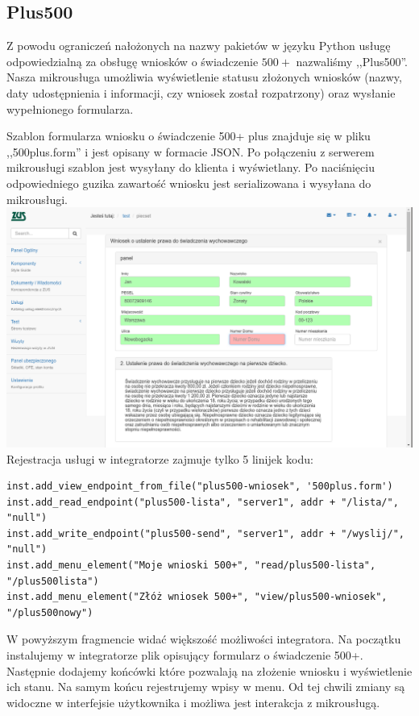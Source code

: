 \documentclass[licencjacka]{pracamgr}
\begin{document}
\subsection{Plus500}

Z powodu ograniczeń nałożonych na nazwy pakietów w języku Python usługę odpowiedzialną
za obsługę wniosków o świadczenie $500+$ nazwaliśmy ,,Plus500''. Nasza mikrousługa
umożliwia wyświetlenie statusu złożonych wniosków (nazwy, daty udostępnienia i informacji,
czy wniosek został rozpatrzony) oraz wysłanie wypełnionego formularza.

Szablon formularza wniosku o świadczenie 500+ plus znajduje się w pliku ,,500plus.form''
i jest opisany w formacie JSON. Po połączeniu z serwerem mikrousługi szablon jest
wysyłany do klienta i wyświetlany. Po naciśnięciu odpowiedniego guzika zawartość
wniosku jest serializowana i wysyłana do mikrousługi.\\
\includegraphics[width=\textwidth]{obrazki/piecset.png}
Rejestracja usługi w integratorze zajmuje tylko 5 linijek kodu:
\begin{verbatim}
inst.add_view_endpoint_from_file("plus500-wniosek", '500plus.form')
inst.add_read_endpoint("plus500-lista", "server1", addr + "/lista/", "null")
inst.add_write_endpoint("plus500-send", "server1", addr + "/wyslij/", "null")
inst.add_menu_element("Moje wnioski 500+", "read/plus500-lista", "/plus500lista")
inst.add_menu_element("Złóż wniosek 500+", "view/plus500-wniosek", "/plus500nowy")
\end{verbatim}
W powyższym fragmencie widać większość możliwości integratora. Na początku
instalujemy w integratorze plik opisujący formularz o świadczenie 500+. Następnie
dodajemy końcówki które pozwalają na złożenie wniosku i wyświetlenie ich stanu. Na
samym końcu rejestrujemy wpisy w menu. Od tej chwili zmiany są widoczne w interfejsie
użytkownika i możliwa jest interakcja z mikrousługą.
\end{document}
